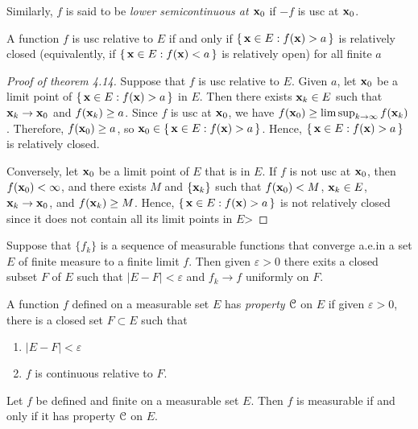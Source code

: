 Similarly, $f$ is said to be \emph{lower semicontinuous at $\mathbf{x}_0$} if
$-f$ is usc at $\mathbf{x}_0$.

\begin{theorem*}[4.14]
A function $f$ is usc relative to $E$ if and only if $\left\{\,\mathbf{x}\in
  E:f(\mathbf{x})>a\,\right\}$ is relatively closed (equivalently, if
$\left\{\,\mathbf{x}\in E:f(\mathbf{x})<a\,\right\}$ is relatively open) for all finite
$a$
\end{theorem*}
\begin{proof}[Proof of theorem 4.14]
Suppose that $f$ is usc relative to $E$. Given $a$, let $\mathbf{x}_0$ be a limit
point of $\left\{\,\mathbf{x}\in E:f(\mathbf{x})>a\,\right\}$ in $E$. Then there exists
$\mathbf{x}_k\in E$ such that $\mathbf{x}_k\to\mathbf{x}_0$ and $f(\mathbf{x}_k)\geq a$. Since $f$
is usc at $\mathbf{x}_0$, we have $f(\mathbf{x}_0)\geq\limsup_{k\to\infty}
f(\mathbf{x}_k)$. Therefore, $f(\mathbf{x}_0)\geq a$, so $\mathbf{x}_0\in\left\{\,\mathbf{x}\in
  E:f(\mathbf{x})>a\,\right\}$. Hence, $\left\{\,\mathbf{x}\in E:f(\mathbf{x})>a\,\right\}$
is relatively closed.

Conversely, let $\mathbf{x}_0$ be a limit point of $E$ that is in $E$. If $f$ is
not usc at $\mathbf{x}_0$, then $f(\mathbf{x}_0)<\infty$, and there exists $M$ and
$\left\{ \mathbf{x}_k \right\}$ such that $f(\mathbf{x}_0)<M$, $\mathbf{x}_k\in E$,
$\mathbf{x}_k\to\mathbf{x}_0$, and $f(\mathbf{x}_k)\geq M$. Hence, $\left\{\,\mathbf{x}\in
  E:f(\mathbf{x})>a\,\right\}$ is not relatively closed since it does not contain
all its limit points in $E$>
\end{proof}
\begin{theorem*}
Suppose that $\{f_k\}$ is a sequence of measurable functions that converge
a.e.\@ in a set $E$ of finite measure to a finite limit $f$. Then given
$\varepsilon>0$ there exits a closed subset $F$ of $E$ such that $|E\minus
F|<\varepsilon$ and $f_k\to f$ uniformly on $F$.
\end{theorem*}
A function $f$ defined on a measurable set $E$ has \emph{property $\mathcal{C}$}
on $E$ if given $\varepsilon>0$, there is a closed set $F\subset E$ such
that
\begin{enumerate}[label=(\roman*)]
\item $|E\minus F|<\varepsilon$
\item $f$ is continuous relative to $F$.
\end{enumerate}
\begin{theorem*}
Let $f$ be defined and finite on a measurable set $E$. Then $f$ is
measurable if and only if it has property $\mathcal{C}$ on $E$.
\end{theorem*}

